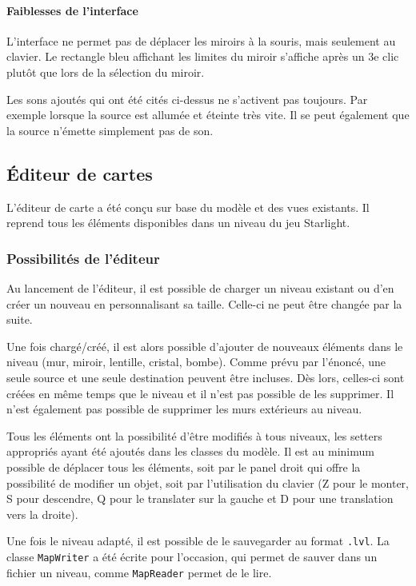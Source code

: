 \documentclass[]{report}
\begin{document}
\paragraph{Faiblesses de l'interface} 

L'interface ne permet pas de déplacer les miroirs à la souris, mais seulement au clavier.
Le rectangle bleu affichant les limites du miroir s'affiche après un 3e clic plutôt 
que lors de la sélection du miroir.

Les sons ajoutés qui ont été cités ci-dessus ne s'activent pas toujours.
Par exemple lorsque la source est allumée et éteinte très vite.
Il se peut également que la source n'émette simplement pas de son.

\newpage
\subsection{\label{Editeur}Éditeur de cartes}

L’éditeur de carte a été conçu sur base du modèle et des vues existants.
Il reprend tous les éléments disponibles dans un niveau du jeu Starlight.

\subsubsection{Possibilités de l'éditeur}

Au lancement de l'éditeur, il est possible de charger un niveau existant 
ou d’en créer un nouveau en personnalisant sa taille. Celle-ci ne peut 
être changée par la suite.

Une fois chargé/créé, il est alors possible d’ajouter de nouveaux éléments 
dans le niveau (mur, miroir, lentille, cristal, bombe). Comme prévu par l'énoncé,
une seule source et une seule destination peuvent être incluses. Dès lors, 
celles-ci sont créées en même temps que le niveau et il n’est pas possible de 
les supprimer. Il n'est également pas possible de supprimer les murs extérieurs
au niveau.

Tous les éléments ont la possibilité d’être modifiés à tous niveaux, les setters
appropriés ayant été ajoutés dans les classes du modèle. Il est au minimum possible de déplacer
tous les éléments, soit par le panel droit qui offre la possibilité de modifier
un objet, soit par l'utilisation du clavier (Z pour le monter, S pour descendre, Q pour le translater
sur la gauche et D pour une translation vers la droite).

Une fois le niveau adapté, il est possible de le sauvegarder au format \texttt{.lvl}. 
La classe \texttt{MapWriter} a été écrite pour l'occasion, qui permet de sauver 
dans un fichier un niveau, comme \texttt{MapReader} permet de le lire.
\end{document}
